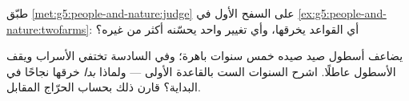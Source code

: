 \begin{exercise}[$\star\star$]\label{exo:g5:people-and-nature:10}
طبّق \cref{met:g5:people-and-nature:judge} على السفح الأول في
\cref{ex:g5:people-and-nature:twofarms}: أي القواعد يخرقها، وأي
تغيير واحد يحسّنه أكثر من غيره؟
\end{exercise}

\begin{exercise}[$\star\star\star$]\label{exo:g5:people-and-nature:11}
يضاعف أسطول صيد صيده خمس سنوات باهرة؛ وفي السادسة تختفي الأسراب
ويقف الأسطول عاطلًا. اشرح السنوات الست بالقاعدة الأولى --- ولماذا
\emph{بدا} خرقها نجاحًا في البداية؟ قارن ذلك بحساب الحرّاج المقابل.
\end{exercise}
